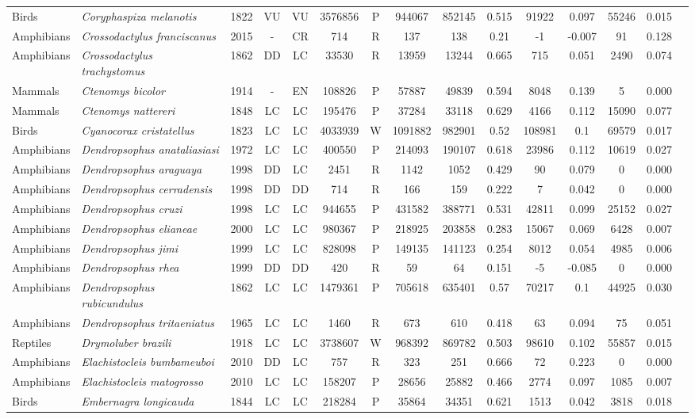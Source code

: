 \documentclass[12pt,openright,oneside,a4paper,english]{abntex2}
\begin{document}
\begin{landscape}
\begin{longtable}{llccccccccccccc}
		Birds&\textit{Coryphaspiza melanotis}&1822&VU&VU&3576856&P&944067&852145&0.515&91922&0.097&55246&0.015\\
		Amphibians&\textit{Crossodactylus franciscanus}&2015&-&CR&714&R&137&138&0.21&-1&-0.007&91&0.128\\
		Amphibians&\textit{Crossodactylus trachystomus}&1862&DD&LC&33530&R&13959&13244&0.665&715&0.051&2490&0.074\\
		Mammals&\textit{Ctenomys bicolor}&1914&-&EN&108826&P&57887&49839&0.594&8048&0.139&5&0.000\\
		Mammals&\textit{Ctenomys nattereri}&1848&LC&LC&195476&P&37284&33118&0.629&4166&0.112&15090&0.077\\
		Birds&\textit{Cyanocorax cristatellus}&1823&LC&LC&4033939&W&1091882&982901&0.52&108981&0.1&69579&0.017\\
		Amphibians&\textit{Dendropsophus anataliasiasi}&1972&LC&LC&400550&P&214093&190107&0.618&23986&0.112&10619&0.027\\
		Amphibians&\textit{Dendropsophus araguaya}&1998&DD&LC&2451&R&1142&1052&0.429&90&0.079&0&0.000\\
		Amphibians&\textit{Dendropsophus cerradensis}&1998&DD&DD&714&R&166&159&0.222&7&0.042&0&0.000\\
		Amphibians&\textit{Dendropsophus cruzi}&1998&LC&LC&944655&P&431582&388771&0.531&42811&0.099&25152&0.027\\
		Amphibians&\textit{Dendropsophus elianeae}&2000&LC&LC&980367&P&218925&203858&0.283&15067&0.069&6428&0.007\\
		Amphibians&\textit{Dendropsophus jimi}&1999&LC&LC&828098&P&149135&141123&0.254&8012&0.054&4985&0.006\\
		Amphibians&\textit{Dendropsophus rhea}&1999&DD&DD&420&R&59&64&0.151&-5&-0.085&0&0.000\\
		Amphibians&\textit{Dendropsophus rubicundulus}&1862&LC&LC&1479361&P&705618&635401&0.57&70217&0.1&44925&0.030\\
		Amphibians&\textit{Dendropsophus tritaeniatus}&1965&LC&LC&1460&R&673&610&0.418&63&0.094&75&0.051\\
		Reptiles&\textit{Drymoluber brazili}&1918&LC&LC&3738607&W&968392&869782&0.503&98610&0.102&55857&0.015\\
		Amphibians&\textit{Elachistocleis bumbameuboi}&2010&DD&LC&757&R&323&251&0.666&72&0.223&0&0.000\\
		Amphibians&\textit{Elachistocleis matogrosso}&2010&LC&LC&158207&P&28656&25882&0.466&2774&0.097&1085&0.007\\
		Birds&\textit{Embernagra longicauda}&1844&LC&LC&218284&P&35864&34351&0.621&1513&0.042&3818&0.018\\

\end{longtable}
\end{landscape}
\end{document}
